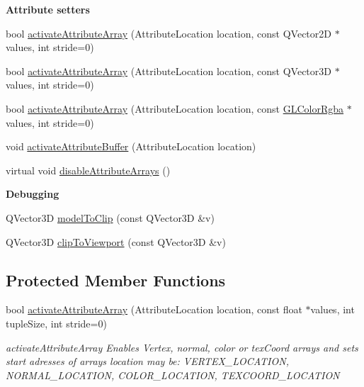 \begin{Indent}\textbf{ Attribute setters}\par
\begin{DoxyCompactItemize}
\item 
bool \mbox{\hyperlink{class_g_l_e_s_renderer_a8529c317862c57c027acce876bad17bb}{activate\+Attribute\+Array}} (Attribute\+Location location, const Q\+Vector2D $\ast$values, int stride=0)
\item 
bool \mbox{\hyperlink{class_g_l_e_s_renderer_a102377bf45b15bb52324214d2e9b6f14}{activate\+Attribute\+Array}} (Attribute\+Location location, const Q\+Vector3D $\ast$values, int stride=0)
\item 
bool \mbox{\hyperlink{class_g_l_e_s_renderer_ada229880a48efdbb3daaa375b701ace0}{activate\+Attribute\+Array}} (Attribute\+Location location, const \mbox{\hyperlink{class_g_l_color_rgba}{G\+L\+Color\+Rgba}} $\ast$values, int stride=0)
\item 
void \mbox{\hyperlink{class_g_l_e_s_renderer_ad0bc53b13af77050b43f7a6ba5f97ea1}{activate\+Attribute\+Buffer}} (Attribute\+Location location)
\item 
virtual void \mbox{\hyperlink{class_g_l_e_s_renderer_a0978cd1fe3baab589b7bfbcde6554c15}{disable\+Attribute\+Arrays}} ()
\end{DoxyCompactItemize}
\end{Indent}
\begin{Indent}\textbf{ Debugging}\par
\begin{DoxyCompactItemize}
\item 
Q\+Vector3D \mbox{\hyperlink{class_g_l_e_s_renderer_a5d591173ee2492417476253eb2e41986}{model\+To\+Clip}} (const Q\+Vector3D \&v)
\item 
Q\+Vector3D \mbox{\hyperlink{class_g_l_e_s_renderer_a531ca73b72e3a00a667b9f8237735724}{clip\+To\+Viewport}} (const Q\+Vector3D \&v)
\end{DoxyCompactItemize}
\end{Indent}
\subsection*{Protected Member Functions}
\begin{DoxyCompactItemize}
\item 
bool \mbox{\hyperlink{class_g_l_e_s_renderer_ae18e97568cc61118fdcb6f9ca0b6480f}{activate\+Attribute\+Array}} (Attribute\+Location location, const float $\ast$values, int tuple\+Size, int stride=0)
\begin{DoxyCompactList}\small\item\em activate\+Attribute\+Array Enables Vertex, normal, color or tex\+Coord arrays and sets start adresses of arrays location may be\+: V\+E\+R\+T\+E\+X\+\_\+\+L\+O\+C\+A\+T\+I\+ON, N\+O\+R\+M\+A\+L\+\_\+\+L\+O\+C\+A\+T\+I\+ON, C\+O\+L\+O\+R\+\_\+\+L\+O\+C\+A\+T\+I\+ON, T\+E\+X\+C\+O\+O\+R\+D\+\_\+\+L\+O\+C\+A\+T\+I\+ON \end{DoxyCompactList}\end{DoxyCompactItemize}
